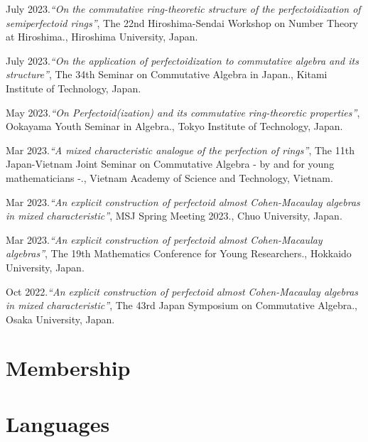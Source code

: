 \documentclass[10pt,a4paper,sans]{moderncv}
\begin{document}
\begin{etaremune}
  \item July 2023.\emph{``On the commutative ring-theoretic structure of the perfectoidization of semiperfectoid rings''}, \textsf{The 22nd Hiroshima-Sendai Workshop on Number Theory at Hiroshima.}, Hiroshima University, Japan.
  \item July 2023.\emph{``On the application of perfectoidization to commutative algebra and its structure''}, \textsf{The 34th Seminar on Commutative Algebra in Japan.}, Kitami Institute of Technology, Japan.
  \item May 2023.\emph{``On Perfectoid(ization) and its commutative ring-theoretic properties''}, \textsf{Ookayama Youth Seminar in Algebra.}, Tokyo Institute of Technology, Japan.
  \item Mar 2023.\emph{``A mixed characteristic analogue of the perfection of rings''}, \textsf{The 11th Japan-Vietnam Joint Seminar on Commutative Algebra - by and for young mathematicians -.}, Vietnam Academy of Science and Technology, Vietnam.
  \item Mar 2023.\emph{``An explicit construction of perfectoid almost Cohen-Macaulay algebras in mixed characteristic''}, \textsf{MSJ Spring Meeting 2023.}, Chuo University, Japan.
  \item Mar 2023.\emph{``An explicit construction of perfectoid almost Cohen-Macaulay algebras''}, \textsf{The 19th Mathematics Conference for Young Researchers.}, Hokkaido University, Japan.
  \item Oct 2022.\emph{``An explicit construction of perfectoid almost Cohen-Macaulay algebras in mixed characteristic''}, \textsf{The 43rd Japan Symposium on Commutative Algebra.}, Osaka University, Japan.
\end{etaremune}


\section{Membership}


\section{Languages}

\end{document}
